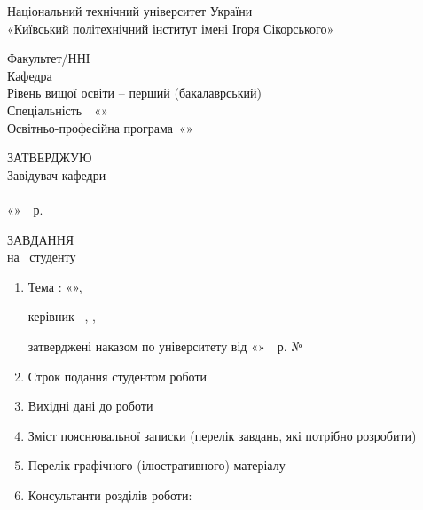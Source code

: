 %
\thispagestyle{empty}

\begin{center}
  Національний технічний університет України\\
  «Київський політехнічний інститут імені Ігоря Сікорського»
\end{center}

\vspace{1em}
\noindent Факультет/ННІ~\facultyName\\
Кафедра~\departmentName\\
Рівень вищої освіти -- перший (бакалаврський)\\
Спеціальність~\specialtyCode~«\specialtyName»\\
Освітньо-професійна програма~«\programmeName»

\vspace{2em}
\begin{flushright}
  \begin{minipage}{7.5cm}
    ЗАТВЕРДЖУЮ\\
    Завідувач кафедри\\
    \hrulefill\ \departmentHeadName\\
    «\hrulefill»\hrulefill~\thesisYear~р.
  \end{minipage}
\end{flushright}

\begin{center}
  ЗАВДАННЯ\\
  на \workType~студенту\\
  \authorFullName
\end{center}

\begin{enumerate}[leftmargin=*]
  \item Тема \workType: «\thesisTitle»,

  керівник \workType~\supervisorFullName, \supervisorRegalia,

  затверджені наказом по університету від «\hrulefill»\hrulefill~\thesisYear~р. №~\hrulefill
  \item Строк подання студентом роботи \hrulefill
  \item Вихідні дані до роботи \hrulefill
  \item Зміст пояснювальної записки (перелік завдань, які потрібно розробити) \hrulefill
  \item Перелік графічного (ілюстративного) матеріалу \hrulefill
  \item Консультанти розділів роботи:
\end{enumerate}

